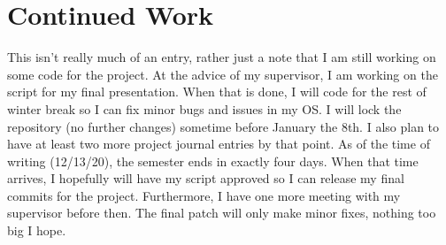 \documentclass[11pt]{article}
\begin{document}
\section{Continued Work}
This isn't really much of an entry, rather just a note that I am still working on some code for the project. At the advice of my supervisor, I am working on the script for my final presentation. When that is done, I will code for the rest of winter break so I can fix minor bugs and issues in my OS. I will lock the repository (no further changes) sometime before January the 8th. I also plan to have at least two more project journal entries by that point. As of the time of writing (12/13/20), the semester ends in exactly four days. When that time arrives, I hopefully will have my script approved so I can release my final commits for the project. Furthermore, I have one more meeting with my supervisor before then. The final patch will only make minor fixes, nothing too big I hope.
\end{document}
